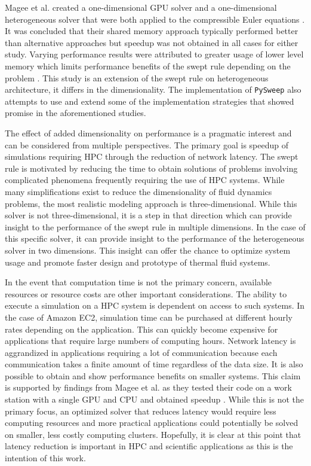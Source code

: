 \documentclass[review]{elsarticle}
\def\pysweep{\texttt{PySweep}}
\begin{document}
\par
Magee et al. created a one-dimensional GPU solver and a one-dimensional heterogeneous solver that were both applied to the compressible Euler equations \cite{Magee2018AcceleratingDecomposition,Magee2020ApplyingSystems}. It was concluded that their shared memory approach typically performed better than alternative approaches but speedup was not obtained in all cases for either study. Varying performance results were attributed to greater usage of lower level memory which limits performance benefits of the swept rule depending on the problem \cite{Magee2018AcceleratingDecomposition}. This study is an extension of the swept rule on heterogeneous architecture, it differs in the dimensionality. The implementation of \pysweep{} also attempts to use and extend some of the implementation strategies that showed promise in the aforementioned studies.

\par
The effect of added dimensionality on performance is a pragmatic interest and can be considered from multiple perspectives. The primary goal is speedup of simulations requiring HPC through the reduction of network latency. The swept rule is motivated by reducing the time to obtain solutions of problems involving complicated phenomena frequently requiring the use of HPC systems. While many simplifications exist to reduce the dimensionality of fluid dynamics problems, the most realistic modeling approach is three-dimensional. While this solver is not three-dimensional, it is a step in that direction which can provide insight to the performance of the swept rule in multiple dimensions. In the case of this specific solver, it can provide insight to the performance of the heterogeneous solver in two dimensions. This insight can offer the chance to optimize system usage and promote faster design and prototype of thermal fluid systems.

\par
In the event that computation time is not the primary concern, available resources or resource costs are other important considerations. The ability to execute a simulation on a HPC system is dependent on access to such systems. In the case of Amazon EC2, simulation time can be purchased at different hourly rates depending on the application\cite{AmazonServices}. This can quickly become expensive for applications that require large numbers of computing hours. Network latency is aggrandized in applications requiring a lot of communication because each communication takes a finite amount of time regardless of the data size. It is also possible to obtain and show performance benefits on smaller systems. This claim is supported by findings from Magee et al. as they tested their code on a work station with a single GPU and CPU and obtained speedup \cite{Magee2018AcceleratingDecomposition}. While this is not the primary focus, an optimized solver that reduces latency would require less computing resources and more practical applications could potentially be solved on smaller, less costly computing clusters. Hopefully, it is clear at this point that latency reduction is important in HPC and scientific applications as this is the intention of this work.
\end{document}

